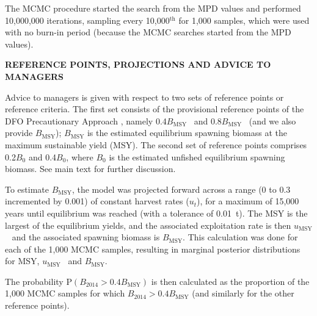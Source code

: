 \documentclass[11pt]{article}   %
\def\finalYr{2014}               %
\def\headc{\vspace{-1ex}} %
\def\subsub#1{\noindent {\bf #1} \headc}    %
\newcommand{\EstM}{`Estimate \emph{M}'}
\newcommand{\FixM}{`Fix \emph{M}'}
\newcommand{\Bmsy}{$B_\mathrm{MSY}$}
\newcommand{\umsy}{$u_\mathrm{MSY}$}
\begin{document}
\subsub{MCMC properties}

The MCMC procedure started the search from the MPD values and performed 10,000,000 iterations, sampling every 10,000$^\mathrm{th}$ for 1,000 samples, which were used with no burn-in period (because the MCMC searches started from the MPD values).  

{\bf REFERENCE POINTS, PROJECTIONS AND ADVICE TO MANAGERS}

Advice to managers is given with respect to two sets of reference points or reference criteria. The first set consists of the provisional reference points of the DFO Precautionary Approach \citep{dfo06}, namely 0.4\Bmsy~ and 0.8\Bmsy~ (and we also provide \Bmsy); \Bmsy{} is the estimated equilibrium spawning biomass at the maximum sustainable yield (MSY). The second set of reference points comprises 0.2$B_0$ and 0.4$B_0$, where $B_0$ is the estimated unfished equilibrium spawning biomass. See main text for further discussion.

To estimate \Bmsy, the model was projected forward across a range (0 to 0.3 incremented by 0.001) of constant harvest rates ($u_t$), for a maximum of 15,000 years until equilibrium was reached (with a tolerance of 0.01~t). The MSY is the largest of the equilibrium yields, and the associated exploitation rate is then \umsy~ and the associated spawning biomass is \Bmsy. This calculation was done for each of the 1,000 MCMC samples, resulting in marginal posterior distributions for MSY, \umsy~ and \Bmsy. 


The probability P$(B_{\finalYr} > 0.4 B_\mathrm{MSY})$ is then calculated as the proportion of the 1,000 MCMC samples for which $B_{\finalYr} > 0.4 B_\mathrm{MSY}$ (and similarly for the other reference points).
\end{document}

